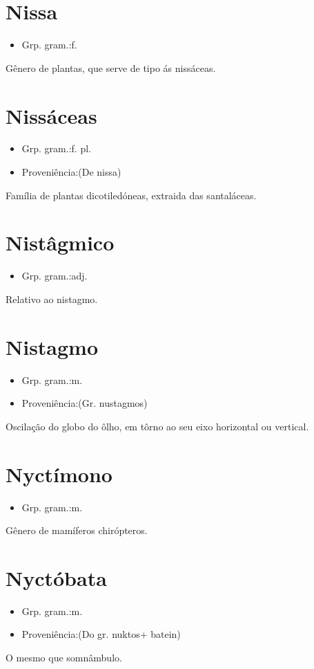 \section{Nissa}
\begin{itemize}
\item {Grp. gram.:f.}
\end{itemize}
Gênero de plantas, que serve de tipo ás nissáceas.
\section{Nissáceas}
\begin{itemize}
\item {Grp. gram.:f. pl.}
\end{itemize}
\begin{itemize}
\item {Proveniência:(De \textunderscore nissa\textunderscore )}
\end{itemize}
Família de plantas dicotiledóneas, extraida das santaláceas.
\section{Nistâgmico}
\begin{itemize}
\item {Grp. gram.:adj.}
\end{itemize}
Relativo ao nistagmo.
\section{Nistagmo}
\begin{itemize}
\item {Grp. gram.:m.}
\end{itemize}
\begin{itemize}
\item {Proveniência:(Gr. \textunderscore nustagmos\textunderscore )}
\end{itemize}
Oscilação do globo do ôlho, em tôrno ao seu eixo horizontal ou vertical.
\section{Nyctímono}
\begin{itemize}
\item {Grp. gram.:m.}
\end{itemize}
Gênero de mamíferos chirópteros.
\section{Nyctóbata}
\begin{itemize}
\item {Grp. gram.:m.}
\end{itemize}
\begin{itemize}
\item {Proveniência:(Do gr. \textunderscore nuktos\textunderscore  + \textunderscore batein\textunderscore )}
\end{itemize}
O mesmo que \textunderscore somnâmbulo\textunderscore .
